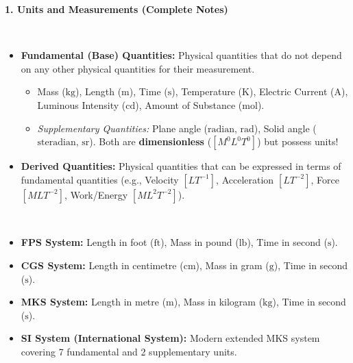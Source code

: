 \documentclass[11pt,a4paper]{article}
\begin{document}
\begin{tcolorbox}[chapterbanner]
  {\Large \textbf{\textsf{1. Units and Measurements (Complete Notes)}}}
\end{tcolorbox}
\vspace{4pt}

\noindent{\large\textbf{\textsf{\textcolor{primaryDark}{1.1 Fundamental vs. Derived Quantities}}}}\\[3pt]
\begin{itemize}[leftmargin=14pt,itemsep=2pt]
  \item \textbf{Fundamental (Base) Quantities:} Physical quantities that do not depend on any other physical quantities for their measurement.
  \begin{itemize}[leftmargin=12pt,itemsep=1pt]
    \item Mass ($\text{kg}$), Length ($\text{m}$), Time ($\text{s}$), Temperature ($\text{K}$), Electric Current ($\text{A}$), Luminous Intensity ($\text{cd}$), Amount of Substance ($\text{mol}$).
    \item \textit{Supplementary Quantities:} Plane angle ($\text{radian, rad}$), Solid angle ($\text{steradian, sr}$). Both are \textbf{dimensionless} ($[M^0 L^0 T^0]$) but possess units!
  \end{itemize}
  \item \textbf{Derived Quantities:} Physical quantities that can be expressed in terms of fundamental quantities (e.g., Velocity $[LT^{-1}]$, Acceleration $[LT^{-2}]$, Force $[MLT^{-2}]$, Work/Energy $[ML^2T^{-2}]$).
\end{itemize}

\vspace{5pt}
\noindent{\large\textbf{\textsf{\textcolor{primaryDark}{1.2 Systems of Units}}}}\\[3pt]
\begin{itemize}[leftmargin=14pt,itemsep=1pt]
  \item \textbf{FPS System:} Length in foot ($\text{ft}$), Mass in pound ($\text{lb}$), Time in second ($\text{s}$).
  \item \textbf{CGS System:} Length in centimetre ($\text{cm}$), Mass in gram ($\text{g}$), Time in second ($\text{s}$).
  \item \textbf{MKS System:} Length in metre ($\text{m}$), Mass in kilogram ($\text{kg}$), Time in second ($\text{s}$).
  \item \textbf{SI System (International System):} Modern extended MKS system covering 7 fundamental and 2 supplementary units.
\end{itemize}
\end{document}
